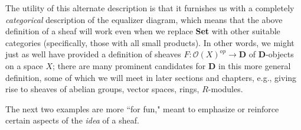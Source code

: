 \documentclass[a4paper]{book}
\theoremstyle{definition}
\theoremstyle{definition}
\theoremstyle{definition}
\theoremstyle{theorem}
\theoremstyle{definition}
\begin{document}
\begin{center} 
\end{center} 
The utility of this alternate description is that it furnishes us with a completely \textit{categorical} description of the equalizer diagram, which means that the above definition of a sheaf will work even when we replace \textbf{Set} with other suitable categories (specifically, those with all small products). In other words, we might just as well have provided a definition of sheaves $F: \mathscr{O}(X)^{op} \rightarrow \textbf{D}$ of \textbf{D}-objects on a space $X$; there are many prominent candidates for \textbf{D} in this more general definition, some of which we will meet in later sections and chapters, e.g., giving rise to sheaves of abelian groups, vector spaces, rings, $R$-modules. \par 
The next two examples are more ``for fun," meant to emphasize or reinforce certain aspects of the \textit{idea} of a sheaf.
\end{document}
